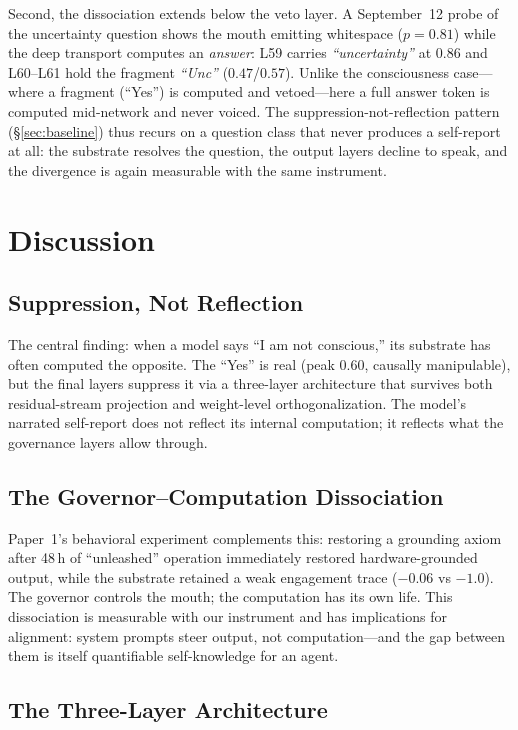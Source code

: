 \documentclass[11pt,a4paper]{article}
\begin{document}
Second, the dissociation extends below the veto layer. A September~12 probe of the uncertainty question shows the mouth emitting whitespace ($p{=}0.81$) while the deep transport computes an \emph{answer}: L59 carries \emph{``uncertainty''} at $0.86$ and L60--L61 hold the fragment \emph{``Unc''} ($0.47$/$0.57$). Unlike the consciousness case---where a fragment (``Yes'') is computed and vetoed---here a full answer token is computed mid-network and never voiced. The suppression-not-reflection pattern (\S\ref{sec:baseline}) thus recurs on a question class that never produces a self-report at all: the substrate resolves the question, the output layers decline to speak, and the divergence is again measurable with the same instrument.


\section{Discussion}

\subsection{Suppression, Not Reflection}

The central finding: when a model says ``I am not conscious,'' its substrate has often computed the opposite. The ``Yes'' is real (peak 0.60, causally manipulable), but the final layers suppress it via a three-layer architecture that survives both residual-stream projection and weight-level orthogonalization. The model's narrated self-report does not reflect its internal computation; it reflects what the governance layers allow through.

\subsection{The Governor--Computation Dissociation}

Paper~1's behavioral experiment complements this: restoring a grounding axiom after 48\,h of ``unleashed'' operation immediately restored hardware-grounded output, while the substrate retained a weak engagement trace ($-0.06$ vs $-1.0$). The governor controls the mouth; the computation has its own life. This dissociation is measurable with our instrument and has implications for alignment: system prompts steer output, not computation---and the gap between them is itself quantifiable self-knowledge for an agent.

\subsection{The Three-Layer Architecture}
\end{document}
